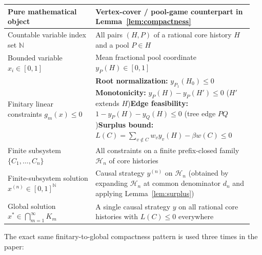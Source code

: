 \documentclass[11pt,letterpaper]{article}
\begin{document}
\begin{center}
\small\renewcommand{\arraystretch}{1.28}
\begin{tabular}{@{}>{\raggedright\arraybackslash}p{0.34\linewidth}>{\raggedright\arraybackslash}p{0.61\linewidth}@{}}
\hline
\textbf{Pure mathematical object} & \textbf{Vertex-cover / pool-game counterpart in Lemma~\ref{lem:compactness}} \\
\hline
Countable variable index set $\mathbb N$ & All pairs $(H,P)$ of a rational core history $H$ and a pool $P\in H$ \\
Bounded variable $x_i\in[0,1]$ & Mean fractional pool coordinate $y_P(H)\in[0,1]$ \\
Finitary linear constraints $g_m(x)\le 0$ & \textbf{Root normalization:} $y_{P_1}(H_0)\le 0$\newline \textbf{Monotonicity:} $y_P(H)-y_P(H')\le 0$ ($H'$ extends $H$)\newline \textbf{Edge feasibility:} $1-y_P(H)-y_Q(H)\le 0$ (tree edge $PQ$)\newline \textbf{Surplus bound:} $L(C) = \sum_{v\notin C} w_v y_v(H) - \beta w(C) \le 0$ \\
Finite subsystem $\{C_1,\ldots,C_n\}$ & All constraints on a finite prefix-closed family $\mathcal H_n$ of core histories \\
Finite-subsystem solution $x^{(n)}\in[0,1]^{\mathbb N}$ & Causal strategy $y^{(n)}$ on $\mathcal H_n$ (obtained by expanding $\mathcal H_n$ at common denominator $d_n$ and applying Lemma~\ref{lem:surplus}) \\
Global solution $x^*\in\bigcap_{m=1}^\infty K_m$ & A single causal strategy $y$ on all rational core histories with $L(C)\le 0$ everywhere \\
\hline
\end{tabular}
\end{center}

\medskip
The exact same finitary-to-global compactness pattern is used three times in the paper:
\end{document}

